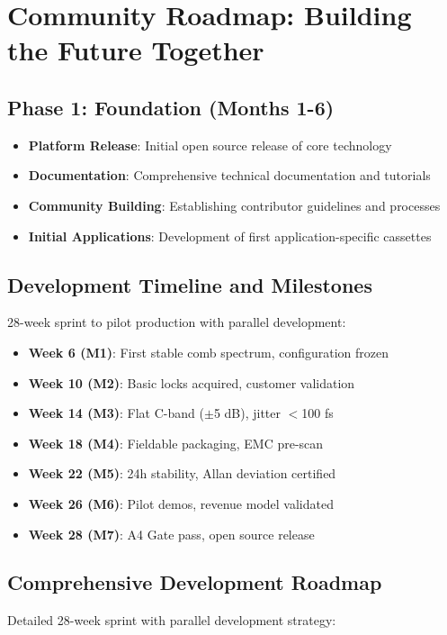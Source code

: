 \documentclass[11pt,a4paper]{article}
\begin{document}
\section{Community Roadmap: Building the Future Together}

\subsection{Phase 1: Foundation (Months 1-6)}
\begin{itemize}
\item \textbf{Platform Release}: Initial open source release of core technology
\item \textbf{Documentation}: Comprehensive technical documentation and tutorials
\item \textbf{Community Building}: Establishing contributor guidelines and processes
\item \textbf{Initial Applications}: Development of first application-specific cassettes
\end{itemize}

\subsection{Development Timeline and Milestones}
28-week sprint to pilot production with parallel development:
\begin{itemize}
\item \textbf{Week 6 (M1)}: First stable comb spectrum, configuration frozen
\item \textbf{Week 10 (M2)}: Basic locks acquired, customer validation
\item \textbf{Week 14 (M3)}: Flat C-band ($\pm$5 dB), jitter $<$100 fs
\item \textbf{Week 18 (M4)}: Fieldable packaging, EMC pre-scan
\item \textbf{Week 22 (M5)}: 24h stability, Allan deviation certified
\item \textbf{Week 26 (M6)}: Pilot demos, revenue model validated
\item \textbf{Week 28 (M7)}: A4 Gate pass, open source release
\end{itemize}

\subsection{Comprehensive Development Roadmap}
Detailed 28-week sprint with parallel development strategy:
\end{document}
